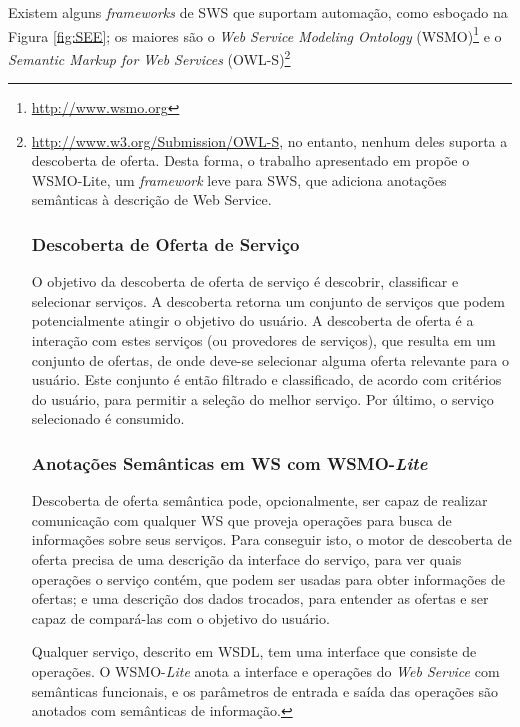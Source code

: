 Existem alguns \textit{frameworks} de SWS que suportam automação, como esboçado na Figura \ref{fig:SEE}; os maiores são o \textit{Web Service Modeling Ontology} (WSMO)\footnote{\url{http://www.wsmo.org}} e o \textit{Semantic Markup for Web Services} (OWL-S)\footnote{\url{http://www.w3.org/Submission/OWL-S}, no entanto, nenhum deles suporta a descoberta de oferta. Desta forma, o trabalho apresentado em  \cite{kopecky2008semantic} propõe o WSMO-Lite, um \textit{framework} leve para SWS, que adiciona anotações semânticas à descrição de Web Service.

\subsubsection{Descoberta de Oferta de Serviço}

O objetivo da descoberta de oferta de serviço é descobrir, classificar e selecionar serviços. A descoberta retorna um conjunto de serviços que podem potencialmente atingir o objetivo do usuário.  A descoberta de oferta é a interação com estes serviços (ou provedores de serviços), que resulta em um conjunto de ofertas, de onde deve-se selecionar alguma oferta relevante para o usuário. Este conjunto é então filtrado e classificado, de acordo com critérios do usuário, para permitir a seleção do melhor serviço. Por último, o serviço selecionado é consumido. \cite{kopecky2008semantic}

\subsubsection{Anotações Semânticas em WS com WSMO-\textit{Lite}}

Descoberta de oferta semântica pode, opcionalmente, ser capaz de realizar comunicação com qualquer WS que proveja operações para busca de informações sobre seus serviços. Para conseguir isto, o motor de descoberta de oferta precisa de uma descrição da interface do serviço, para ver quais operações o serviço contém, que podem ser usadas para obter informações de ofertas; e uma descrição dos dados trocados, para entender as ofertas e ser capaz de compará-las com o objetivo do usuário. \cite{kopecky2008semantic}

Qualquer serviço, descrito em WSDL, tem uma interface que consiste de operações. O WSMO-\textit{Lite} anota a interface e operações do \textit{Web Service} com semânticas funcionais, e os parâmetros de entrada e saída das operações são anotados com semânticas de informação.

}
